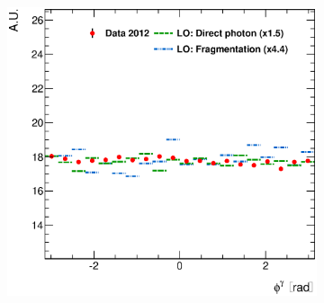 \documentclass[12pt, twoside]{article}
\numberwithin{equation}{section}
\numberwithin{figure}{section}
\newenvironment{changemargin}[2]{%
\begin{list}{}{%
\setlength{\topsep}{0pt}%
\setlength{\leftmargin}{#1}%
\setlength{\rightmargin}{#2}%
\setlength{\listparindent}{\parindent}%
\setlength{\itemindent}{\parindent}%
\setlength{\parsep}{\parskip}%
}%
\item[]}{\end{list}}
\begin{document}
\begin{figure}
\begin{changemargin}{-1.0cm}{-0.75cm}
\begin{changemargin}{-0.75cm}{-1.0cm}
\begin{subfigure}[b]{0.37\textwidth}
            \subcaption{}
            \label{fig:DiffCrossSectDPFPEtaPhoton}
        \end{subfigure}
        \begin{subfigure}[b]{0.37\textwidth}
            \includegraphics[width=\textwidth]{./images/DifferentialCrossSectionsDPFP/NORM_DIFF_CRSS_SEC-103.eps}
            \subcaption{}
            \label{fig:DiffCrossSectDPFPPhiPhoton}
        \end{subfigure}


\end{changemargin}
\end{changemargin}
\end{figure}
\end{document}
